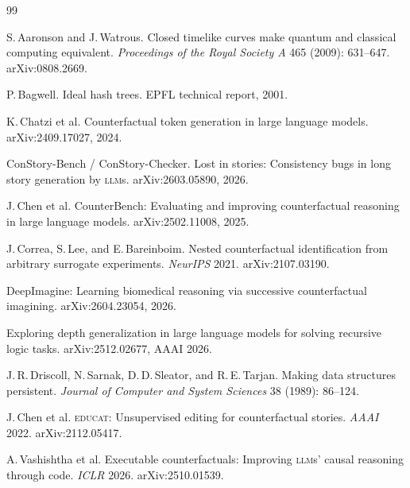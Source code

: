 \documentclass[11pt]{article}
\theoremstyle{rukha}
\newcommand{\sceq}[1]{\textsc{#1}}
\begin{document}
\renewcommand{\refname}{\sceq{References}}

\begin{small}\setlength{\parskip}{0.4ex}

\begin{thebibliography}{99}

S.\,Aaronson and J.\,Watrous.
\newblock Closed timelike curves make quantum and classical computing equivalent.
\newblock \emph{Proceedings of the Royal Society A} 465 (2009): 631–647.
\newblock arXiv:0808.2669.

P.\,Bagwell.
\newblock Ideal hash trees.
\newblock EPFL technical report, 2001.

K.\,Chatzi et al.
\newblock Counterfactual token generation in large language models.
\newblock arXiv:2409.17027, 2024.

ConStory-Bench / ConStory-Checker.
\newblock Lost in stories: Consistency bugs in long story generation by \textsc{llm}s.
\newblock arXiv:2603.05890, 2026.

J.\,Chen et al.
\newblock CounterBench: Evaluating and improving counterfactual reasoning in large language models.
\newblock arXiv:2502.11008, 2025.

J.\,Correa, S.\,Lee, and E.\,Bareinboim.
\newblock Nested counterfactual identification from arbitrary surrogate experiments.
\newblock \emph{NeurIPS} 2021.
\newblock arXiv:2107.03190.

DeepImagine: Learning biomedical reasoning via successive counterfactual imagining.
\newblock arXiv:2604.23054, 2026.

Exploring depth generalization in large language models for solving recursive logic tasks.
\newblock arXiv:2512.02677, AAAI 2026.

J.\,R.\,Driscoll, N.\,Sarnak, D.\,D.\,Sleator, and R.\,E.\,Tarjan.
\newblock Making data structures persistent.
\newblock \emph{Journal of Computer and System Sciences} 38 (1989): 86–124.

J.\,Chen et al.
\newblock \textsc{educat}: Unsupervised editing for counterfactual stories.
\newblock \emph{AAAI} 2022.
\newblock arXiv:2112.05417.

A.\,Vashishtha et al.
\newblock Executable counterfactuals: Improving \textsc{llm}s' causal reasoning through code.
\newblock \emph{ICLR} 2026.
\newblock arXiv:2510.01539.


\end{thebibliography}
\end{small}
\end{document}
